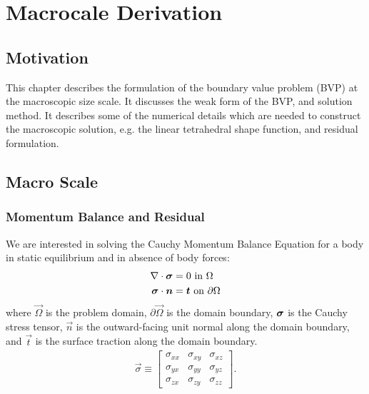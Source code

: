 \chapter{Macrocale Derivation}

\section{Motivation}

This chapter describes the formulation of the boundary value problem (BVP) at the macroscopic size scale. It discusses the weak form of the BVP, and solution method. It describes some of the numerical details which are needed to construct the macroscopic solution, e.g. the linear tetrahedral shape function, and residual formulation.

\section{Macro Scale}

\subsection{Momentum Balance and Residual}

We are interested in solving the Cauchy Momentum Balance Equation for a body in static equilibrium and in absence of body forces:
%
\begin{align}
\nabla \cdot \bm{\sigma} =& \; 0 \text{ in } \Omega \label{momentum_balance} \\
\bm{\sigma} \cdot \bm{n} =& \; \bm{t} \text{ on } \partial \Omega \nonumber
\end{align}
%
where $\vec{\Omega}$ is the problem domain, $\partial \vec{\Omega}$ is the domain boundary, $\bm{\sigma}$ is the Cauchy stress tensor, $\vec{n}$ is the outward-facing unit normal along the domain boundary, and $\vec{t}$ is the surface traction along the domain boundary.
%
\begin{eqnarray}
\vec{\sigma} \equiv
\begin{bmatrix}
\sigma_{xx} & \sigma_{xy} & \sigma_{xz} \\
\sigma_{yx} & \sigma_{yy} & \sigma_{yz} \\
\sigma_{zx} & \sigma_{zy} & \sigma_{zz} 
\end{bmatrix} .
\label{cauchy_stress_tensor}
\end{eqnarray}
%

